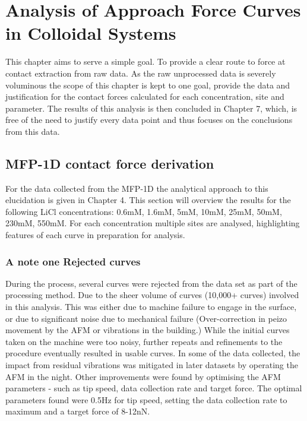 


\chapter{Analysis of Approach Force Curves in Colloidal Systems}
\label{chap:approach_force_curves}

This chapter aims to serve a simple goal. To provide a clear route to force at contact extraction from raw data. As the raw unprocessed data is severely voluminous the scope of this chapter is kept to one goal, provide the data and justification for the contact forces calculated for each concentration, site and parameter. The results of this analysis is then concluded in Chapter 7, which, is free of the need to justify every data point and thus focuses on the conclusions from this data. 

\section{MFP-1D contact force derivation}

For the data collected from the MFP-1D the analytical approach to this elucidation is given in Chapter 4. This section will overview the results for the following LiCl concentrations: 0.6mM, 1.6mM, 5mM, 10mM, 25mM, 50mM, 230mM, 550mM. For each concentration multiple sites are analysed, highlighting features of each curve in preparation for analysis. 

\subsection{A note one Rejected curves}

 During the process, several curves were rejected from the data set as part of the processing method. Due to the sheer volume of curves (10,000+ curves) involved in this analysis.  This was either due to machine failure to engage in the surface, or due to significant noise due to mechanical failure (Over-correction in peizo movement by the AFM or vibrations in the building.) While the initial curves taken on the machine were too noisy, further repeats and refinements to the procedure eventually resulted in usable curves. In some of the data collected, the impact from residual vibrations was mitigated in later datasets by operating the AFM in the night. Other improvements were found by optimising the AFM parameters  - such as tip speed, data collection rate and target force. The optimal parameters found were 0.5Hz for tip speed, setting the data collection rate to maximum and a target force of 8-12nN. 


